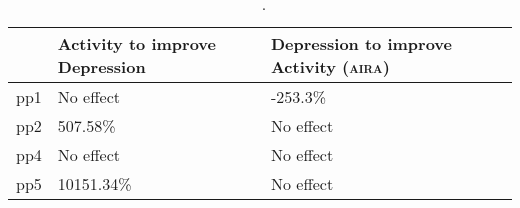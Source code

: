 \begin{table}[ht]
\centering
\begin{tabular}{rll}
  \toprule
 & Activity to improve Depression & Depression to improve Activity (\textsc{aira}) \\ 
  \midrule
pp1 & No effect & -253.3\% \\ 
  pp2 & 507.58\% & No effect \\ 
  pp4 & No effect & No effect \\ 
  pp5 & 10151.34\% & No effect \\ 
   \bottomrule
\end{tabular}
\caption{\citeauthor{RefWorks:4}~\cite{RefWorks:4}.} 
\label{tab:effects}
\end{table}
